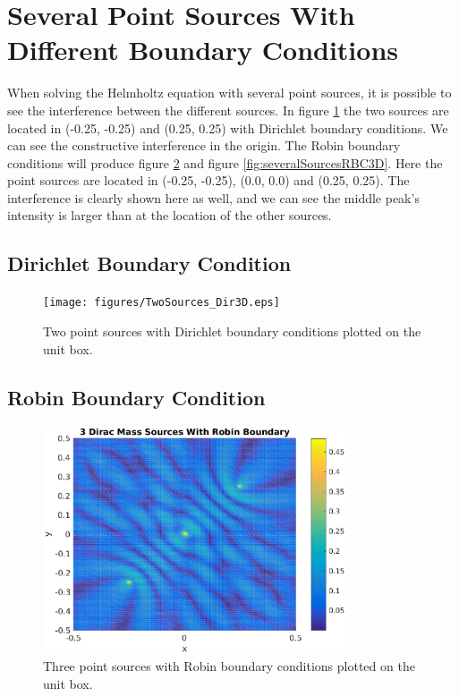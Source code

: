 \documentclass[10pt,a4paper]{article}
\begin{document}
\section*{Several Point Sources With Different Boundary Conditions}
When solving the Helmholtz equation with several point sources, it is possible to see the interference between the different sources. In figure \ref{fig:severalSourcesDBC3D} the two sources are located in (-0.25, -0.25) and (0.25, 0.25) with Dirichlet boundary conditions. We can see the constructive interference in the origin. The Robin boundary conditions will produce figure \ref{fig:severalSourcesRBC2D} and figure \ref{fig:severalSourcesRBC3D}. Here the point sources are located in (-0.25, -0.25), (0.0, 0.0) and (0.25, 0.25). The interference is clearly shown here as well, and we can see the middle peak's intensity is larger than at the location of the other sources.

\subsection*{Dirichlet Boundary Condition}
\begin{figure}[H]
\centering
    \texttt{[image: figures/TwoSources\_Dir3D.eps]}
	\caption{Two point sources with Dirichlet boundary conditions plotted on the unit box.}
  \label{fig:severalSourcesDBC3D}
\end{figure}

\subsection*{Robin Boundary Condition}

\begin{figure}[H]
\centering
    \includegraphics[width=0.8\textwidth]{figures/ThreeSources_2D.eps}
	\caption{Three point sources with Robin boundary conditions plotted on the unit box.}
  \label{fig:severalSourcesRBC2D}
\end{figure}
\end{document}
